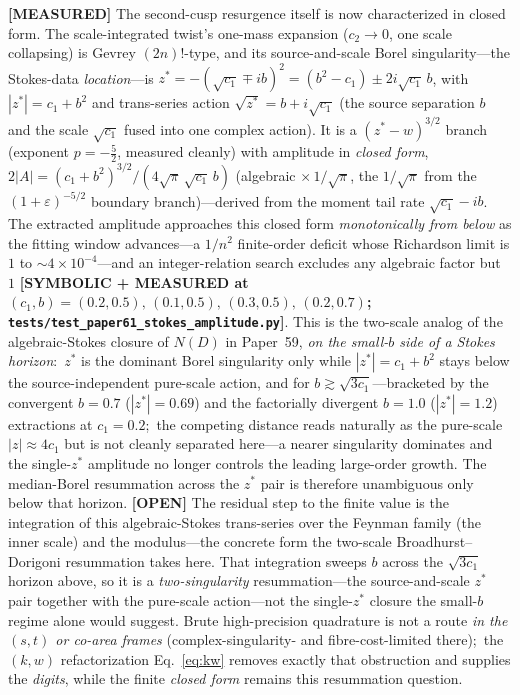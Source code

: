 \documentclass[aps,pra,twocolumn,superscriptaddress,longbibliography]{revtex4-2}
\begin{document}
\textbf{[MEASURED]} The second-cusp resurgence itself is now characterized in closed form.  The
scale-integrated twist's one-mass expansion ($c_{2}\!\to\!0$, one scale collapsing) is Gevrey $(2n)!$-type, and
its source-and-scale Borel singularity---the Stokes-data \emph{location}---is
$z^{*}=-(\sqrt{c_{1}}\mp ib)^{2}=(b^{2}-c_{1})\pm 2i\sqrt{c_{1}}\,b$, with $|z^{*}|=c_{1}+b^{2}$ and
trans-series action $\sqrt{z^{*}}=b+i\sqrt{c_{1}}$ (the source separation $b$ and the scale
$\sqrt{c_{1}}$ fused into one complex action).  It is a $(z^{*}-w)^{3/2}$ branch
(exponent $p=-\tfrac52$, measured cleanly) with amplitude in \emph{closed form},
$2|A|=(c_{1}+b^{2})^{3/2}/(4\sqrt{\pi}\,\sqrt{c_{1}}\,b)$ (algebraic $\times\,1/\sqrt\pi$, the
$1/\sqrt\pi$ from the $(1+\varepsilon)^{-5/2}$ boundary branch)---derived from the moment tail rate
$\sqrt{c_{1}}-ib$.  The extracted amplitude approaches this closed form
\emph{monotonically from below} as the fitting window advances---a $1/n^{2}$
finite-order deficit whose Richardson limit is $1$ to $\sim\!4\times10^{-4}$---and
an integer-relation search excludes any algebraic factor but $1$
\textbf{[SYMBOLIC + MEASURED at $(c_{1},b)=(0.2,0.5),\,(0.1,0.5),\,(0.3,0.5),\,(0.2,0.7)$;
\texttt{tests/test\_paper61\_stokes\_amplitude.py}]}.  This is the two-scale analog
of the algebraic-Stokes closure of $N(D)$ in Paper~59, \emph{on the small-$b$ side
of a Stokes horizon}:\ $z^{*}$ is the dominant Borel singularity only while
$|z^{*}|=c_{1}+b^{2}$ stays below the source-independent pure-scale action, and for
$b\gtrsim\sqrt{3c_{1}}$---bracketed by the convergent $b=0.7$ ($|z^{*}|=0.69$) and the
factorially divergent $b=1.0$ ($|z^{*}|=1.2$) extractions at $c_{1}=0.2$;\ the competing
distance reads naturally as the pure-scale $|z|\approx4c_{1}$ but is not cleanly
separated here---a nearer singularity dominates and the single-$z^{*}$ amplitude no
longer controls the leading large-order growth.  The median-Borel resummation across
the $z^{*}$ pair is therefore unambiguous only below that horizon.  \textbf{[OPEN]} The residual step to the finite value is the
integration of this algebraic-Stokes trans-series over the Feynman family (the inner scale) and the
modulus---the concrete form the two-scale Broadhurst--Dorigoni resummation takes here.  That
integration sweeps $b$ across the $\sqrt{3c_{1}}$ horizon above, so it is a \emph{two-singularity}
resummation---the source-and-scale $z^{*}$ pair together with the pure-scale action---not the
single-$z^{*}$ closure the small-$b$ regime alone would suggest.  Brute
high-precision quadrature is not a route \emph{in the $(s,t)$ or co-area frames}
(complex-singularity- and fibre-cost-limited there);\ the $(k,w)$ refactorization
Eq.~\eqref{eq:kw} removes exactly that obstruction and supplies the \emph{digits}, while the
finite \emph{closed form} remains this resummation question.
\end{document}
